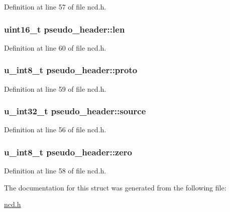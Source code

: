 Definition at line 57 of file ncd.\-h.

\hypertarget{structpseudo__header_a436e199ba010989dff88ba26ee6de668}{
\subsubsection[{len}]{\setlength{\rightskip}{0pt plus 5cm}uint16\-\_\-t pseudo\-\_\-header\-::len}}\label{structpseudo__header_a436e199ba010989dff88ba26ee6de668}


Definition at line 60 of file ncd.\-h.

\hypertarget{structpseudo__header_acdb79cab7f361df75fe519e43e1db18c}{
\subsubsection[{proto}]{\setlength{\rightskip}{0pt plus 5cm}u\-\_\-int8\-\_\-t pseudo\-\_\-header\-::proto}}\label{structpseudo__header_acdb79cab7f361df75fe519e43e1db18c}


Definition at line 59 of file ncd.\-h.

\hypertarget{structpseudo__header_ac1d63e2b666037057fba16b852c83549}{
\subsubsection[{source}]{\setlength{\rightskip}{0pt plus 5cm}u\-\_\-int32\-\_\-t pseudo\-\_\-header\-::source}}\label{structpseudo__header_ac1d63e2b666037057fba16b852c83549}


Definition at line 56 of file ncd.\-h.

\hypertarget{structpseudo__header_a2a93c892eaf942dfb5c28a69c88f0ad7}{
\subsubsection[{zero}]{\setlength{\rightskip}{0pt plus 5cm}u\-\_\-int8\-\_\-t pseudo\-\_\-header\-::zero}}\label{structpseudo__header_a2a93c892eaf942dfb5c28a69c88f0ad7}


Definition at line 58 of file ncd.\-h.



The documentation for this struct was generated from the following file\-:\begin{DoxyCompactItemize}
\item 
\hyperlink{ncd_8h}{ncd.\-h}\end{DoxyCompactItemize}
